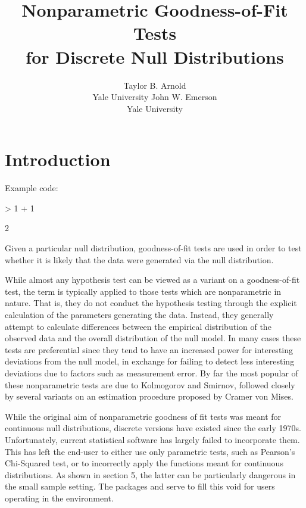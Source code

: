 \documentclass[article]{jss}
\author{Taylor B. Arnold \\ Yale University \And 
        John W. Emerson\\ Yale University}
\title{Nonparametric Goodness-of-Fit Tests \\ for Discrete Null Distributions}
\begin{document}



\section{Introduction}

Example code:
\begin{Schunk}
\begin{Sinput}
> 1 + 1
\end{Sinput}
\begin{Soutput}
[1] 2
\end{Soutput}
\end{Schunk}

Given a particular null distribution, goodness-of-fit tests 
are used in order to test whether it is likely that the data were generated via the null distribution.

While almost any hypothesis test can be viewed as a variant on a goodness-of-fit test, the term is typically
applied to those tests which are nonparametric in nature. That is, they do not conduct the hypothesis testing 
through the explicit calculation of the parameters generating the data. Instead, they generally attempt to 
calculate differences between the empirical distribution of the observed data and the overall distribution 
of the null model. In many cases these tests are preferential since they tend to have an increased power for 
interesting deviations from the null model, in exchange for failing to detect less interesting deviations due to 
factors such as measurement error. By far the most popular of these nonparametric tests are due to Kolmogorov and 
Smirnov, followed closely by several variants on an estimation procedure proposed by Cramer von Mises. 

While the original aim of nonparametric goodness of fit tests was meant for continuous null distributions, discrete versions
have existed since the early 1970s. Unfortunately, current statistical software has largely failed to incorporate them.
This has left the end-user to either use only parametric tests, such as Pearson's Chi-Squared test, or to incorrectly
apply the functions meant for continuous distributions. As shown in section 5, the latter can be particularly dangerous
in the small sample setting. The packages  and  serve to fill this void for users
operating in the  environment. 
\end{document}
